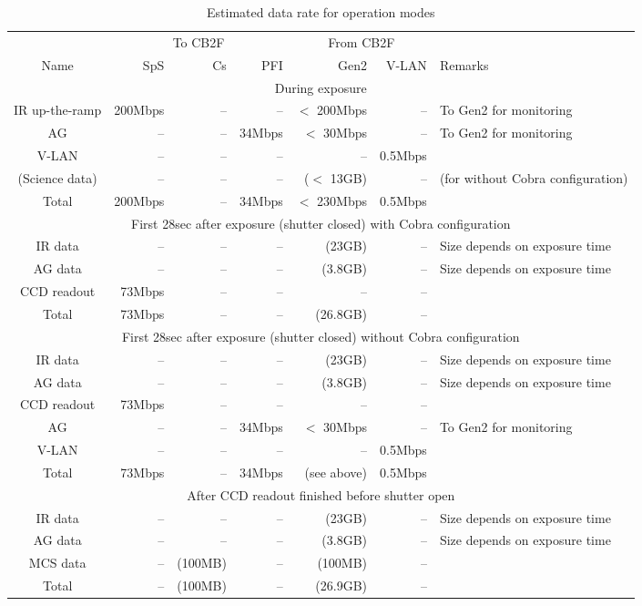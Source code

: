 \documentclass[a4paper,notitlepage]{article}
\begin{document}
\begin{table}[htb]
\caption{Estimated data rate for operation modes}
\label{datarate-modes}
\begin{center}
\begin{tabular}{c||r|r|r||r|r||l}
     & \multicolumn{3}{c||}{To CB2F} & \multicolumn{2}{c||}{From CB2F} &  \\
Name & SpS & Cs & PFI & Gen2 & V-LAN & Remarks \\
\hline
\hline
\multicolumn{7}{c}{During exposure} \\
\hline
IR up-the-ramp & 200Mbps & -- & -- & $<$ 200Mbps & -- & To Gen2 for monitoring \\
AG & -- & -- & 34Mbps & $<$ 30Mbps & -- & To Gen2 for monitoring \\
V-LAN & -- & -- & -- & -- & 0.5Mbps & \\
(Science data) & -- & -- & -- & ($<$ 13GB) & -- & (for without Cobra configuration) \\
\hline
Total & 200Mbps & -- & 34Mbps & $<$ 230Mbps & 0.5Mbps &  \\
\hline
\hline
\multicolumn{7}{c}{First 28sec after exposure (shutter closed) with Cobra 
  configuration} \\
\hline
IR data & -- & -- & -- & (23GB) & -- & Size depends on exposure time \\
AG data & -- & -- & -- & (3.8GB) & -- & Size depends on exposure time \\
CCD readout & 73Mbps & -- & -- & -- & -- & \\
\hline
Total & 73Mbps & -- & -- & (26.8GB) & -- &  \\
\hline
\hline
\multicolumn{7}{c}{First 28sec after exposure (shutter closed) without Cobra 
  configuration} \\
\hline
IR data & -- & -- & -- & (23GB) & -- & Size depends on exposure time \\
AG data & -- & -- & -- & (3.8GB) & -- & Size depends on exposure time \\
CCD readout & 73Mbps & -- & -- & -- & -- & \\
AG & -- & -- & 34Mbps & $<$ 30Mbps & -- & To Gen2 for monitoring \\
V-LAN & -- & -- & -- & -- & 0.5Mbps & \\
\hline
Total & 73Mbps & -- & 34Mbps & (see above) & 0.5Mbps &  \\
\hline
\hline
\multicolumn{7}{c}{After CCD readout finished before shutter open} \\
\hline
IR data & -- & -- & -- & (23GB) & -- & Size depends on exposure time \\
AG data & -- & -- & -- & (3.8GB) & -- & Size depends on exposure time \\
MCS data & -- & (100MB) & -- & (100MB) & -- & \\
\hline
Total & -- & (100MB) & -- & (26.9GB) & -- &  \\
\hline
\hline
\end{tabular}
\end{center}
\end{table}
\end{document}
